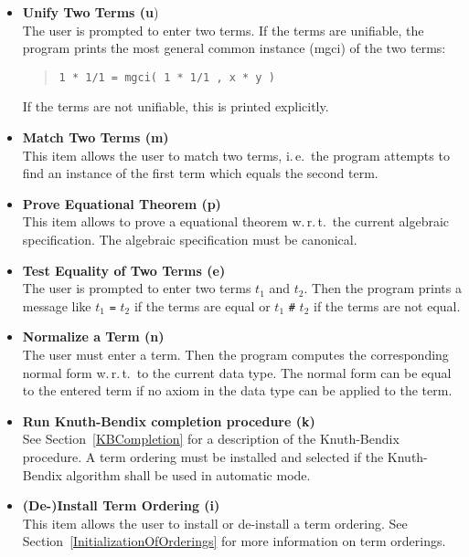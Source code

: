 \begin{itemize}
\item {\bf Unify Two Terms (u})\\
The user is prompted to enter two terms.
If the terms are unifiable, the program prints the
most general common instance (mgci) of the two terms:
\begin{quote}
\begin{verbatim}
1 * 1/1 = mgci( 1 * 1/1 , x * y )
\end{verbatim}
\end{quote}

If the terms are not unifiable, this is printed explicitly.

\item {\bf Match Two Terms (m)}\\
This item allows the user to match two terms, i.\,e.\  the program attempts
to find an instance of the first term which equals the second term.

\item {\bf Prove Equational Theorem (p)}\\
This item allows to prove a equational theorem w.\,r.\,t.\  the
current algebraic specification. The algebraic specification must be
canonical.

\item {\bf Test Equality of Two Terms (e)}\\
The user is prompted to enter two terms $t_1$ and $t_2$. Then the program 
prints a message like $t_1$ \verb/=/ $t_2$ if the terms are equal
or $t_1$ \verb/#/ $t_2$ if the terms are not equal.

\item {\bf Normalize a Term (n)}\\
The user must enter a term. Then the program 
computes the corresponding normal form w.\,r.\,t.\  to the current data 
type. The normal form can be equal to the entered term if no axiom in
the data type can be applied to the term.

\item {\bf Run Knuth-Bendix completion procedure (k)}\\
See Section~\ref{KBCompletion} for a description of the
Knuth-Bendix procedure. A term ordering must be installed and selected
if the Knuth-Bendix algorithm shall be used in automatic mode.

\item{\bf (De-)Install Term Ordering (i)}\\
This item allows the user to install or de-install a term ordering. See 
Section~\ref{InitializationOfOrderings} for more information
on term orderings.


\end{itemize}
